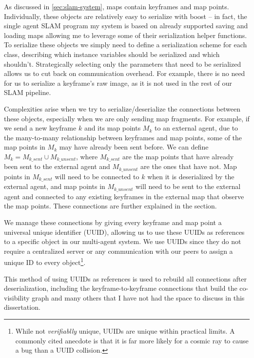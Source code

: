 As discussed in \autoref{sec:slam-system}, maps contain keyframes and map points. Individually, these objects are relatively easy to serialize with boost – in fact, the single agent SLAM program my system is based on already supported saving and loading maps allowing me to leverage some of their serialization helper functions. To serialize these objects we simply need to define a serialization scheme for each class, describing which instance variables should be serialized and which shouldn't. Strategically selecting only the parameters that need to be serialized allows us to cut back on communication overhead. For example, there is no need for us to serialize a keyframe's raw image, as it is not used in the rest of our SLAM pipeline.

Complexities arise when we try to serialize/deserialize the connections between these objects, especially when we are only sending map fragments. For example, if we send a new keyframe $k$ and its map points $M_k$ to an external agent, due to the many-to-many relationship between keyframes and map points, some of the map points in $M_k$ may have already been sent before. We can define $M_k = M_{k\_sent} \cup M_{k\_unsent}$, where $M_{k\_sent}$ are the map points that have already been sent to the external agent and $M_{k\_unsent}$ are the ones that have not. Map points in $M_{k\_sent}$ will need to be connected to $k$ when it is deserialized by the external agent, and map points in $M_{k\_unsent}$ will need to be sent to the external agent and connected to any existing keyframes in the external map that observe the map points. These connections are further explained in the  section.

We manage these connections by giving every keyframe and map point a universal unique identifier (UUID), allowing us to use these UUIDs as references to a specific object in our multi-agent system. We use UUIDs since they do not require a centralized server or any communication with our peers to assign a unique ID to every object\footnote[1]{While not \textit{verifiablly} unique, UUIDs are unique within practical limits. A commonly cited anecdote is that it is far more likely for a cosmic ray to cause a bug than a UUID collision.}.

This method of using UUIDs as references is used to rebuild all connections after deserialization, including the keyframe-to-keyframe connections that build the co-visibility graph and many others that I have not had the space to discuss in this dissertation.


